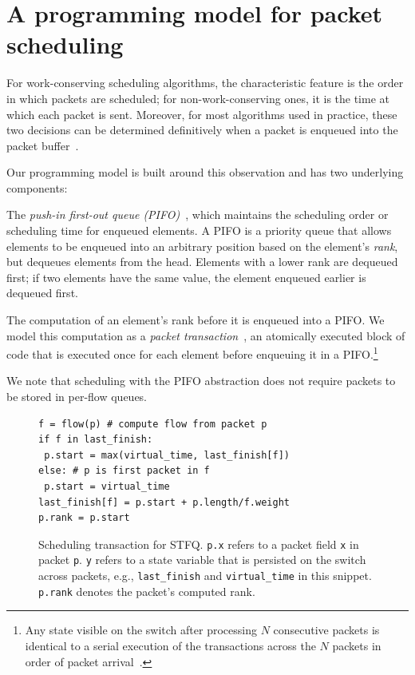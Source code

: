 \section{A programming model for packet scheduling}
\label{s:pifo}

For work-conserving scheduling algorithms, the characteristic feature
is the order in which packets are scheduled; for non-work-conserving
ones, it is the time at which each packet is sent. Moreover, for most
algorithms used in practice, these two decisions can be determined
definitively when a packet is enqueued into the packet
buffer~\cite{pifo_hotnets}.

Our programming model is built around this observation and has two
underlying components:
\begin{CompactEnumerate}
\item The {\em push-in first-out queue (PIFO)}~\cite{pifo}, which
  maintains the scheduling order or scheduling time for enqueued
  elements. A PIFO is a priority queue that allows elements to be
  enqueued into an arbitrary position based on the element's {\em
    rank}, but dequeues elements from the head. Elements with a lower
  rank are dequeued first; if two elements have the same value, the
  element enqueued earlier is dequeued first.

\item The computation of an element's rank before it is enqueued into
  a PIFO. We model this computation as a {\em packet
    transaction}~\cite{domino_sigcomm}, an atomically executed block
  of code that is executed once for each element before enqueuing it
  in a PIFO.\footnote{Any state visible on the switch after processing
    $N$ consecutive packets is identical to a serial execution of the
    transactions across the $N$ packets in order of packet
    arrival~\cite{domino_sigcomm}.}
\end{CompactEnumerate}

We note that scheduling with the PIFO abstraction does not require packets to be
stored in per-flow queues.

\begin{figure}
\begin{lstlisting}[style=customc]
f = flow(p) # compute flow from packet p
if f in last_finish:
 p.start = max(virtual_time, last_finish[f])
else: # p is first packet in f
 p.start = virtual_time
last_finish[f] = p.start + p.length/f.weight
p.rank = p.start
\end{lstlisting}
\caption{Scheduling transaction for STFQ. {\tt p.x} refers to a packet
  field {\tt x} in packet {\tt p}.  {\tt y} refers to a state variable
  that is persisted on the switch across packets, e.g., {\tt last\_finish}
  and {\tt virtual\_time} in this snippet. {\tt p.rank} denotes the
  packet's computed rank.}
\label{fig:sched_trans}
\end{figure}

